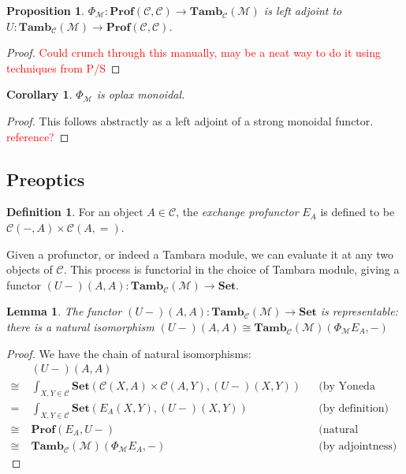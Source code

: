 \documentclass[11pt,a4paper]{article}
\theoremstyle{plain}
\newtheorem{proposition}[theorem]{Proposition}
\newtheorem{lemma}[theorem]{Lemma}
\newtheorem{corollary}[theorem]{Corollary}
\theoremstyle{definition}
\newtheorem{definition}[theorem]{Definition}
\newcommand{\C}{\mathscr{C}}
\newcommand{\M}{\mathscr{M}}
\newcommand{\Pastro}{\Phi}
\newcommand{\Set}{\mathbf{Set}}
\newcommand{\Prof}{\mathbf{Prof}}
\newcommand{\Tamb}{\mathbf{Tamb}}
\newcommand{\todo}[1]{\textcolor{red}{\small #1}}
\begin{document}
\begin{proposition}
$\Pastro_\M : \Prof(\C, \C) \to \Tamb_\C(\M)$ is left adjoint to $U : \Tamb_\C(\M) \to \Prof(\C, \C)$.
\end{proposition}
\begin{proof}
\todo{Could crunch through this manually, may be a neat way to do it using techniques from P/S}
\end{proof}

\begin{corollary}
$\Pastro_\M$ is oplax monoidal.
\end{corollary}
\begin{proof}
This follows abstractly as a left adjoint of a strong monoidal functor. \todo{reference?}
\end{proof}

\subsection{Preoptics}

\begin{definition}
For an object $A \in \C$, the \emph{exchange profunctor} $E_A$ is defined to be $\C(-, A) \times \C(A, {=})$.
\end{definition}

Given a profunctor, or indeed a Tambara module, we can evaluate it at any two objects of $\C$. This process is functorial in the choice of Tambara module, giving a functor $(U-)(A,A) : \Tamb_\C(\M) \to \Set$.

\begin{lemma}
\label{lemma-rep}
The functor $(U-)(A,A) : \Tamb_\C(\M) \to \Set$ is representable: there is a natural isomorphism
$(U-)(A,A) \cong \Tamb_\C(\M)(\Pastro_\M E_A, -)$
\end{lemma}
\begin{proof}
We have the chain of natural isomorphisms:
\begin{align*}
&(U-)(A,A) \\
\cong \;&\int_{X,Y \in \C} \Set(\C(X,A) \times \C(A,Y), (U-)(X,Y)) && \text{(by Yoneda (un)reduction twice)} \\
=\;&\int_{X,Y \in \C} \Set(E_A(X,Y), (U-)(X,Y)) && \text{(by definition)}\\
\cong \;&\Prof(E_A, U-) && \text{(natural transformations as ends)} \\
\cong \;&\Tamb_\C(\M)(\Pastro_\M E_A, -) && \text{(by adjointness)} 
\end{align*}
\end{proof}
\end{document}
